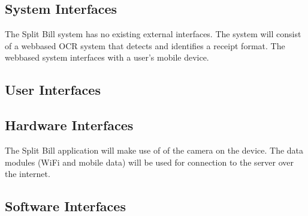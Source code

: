 \documentclass[12pt,a4paper]{article}
\begin{document}
   	\subsection{System Interfaces}
   		
		The Split Bill system has no existing external interfaces. The system will consist of a webbased OCR system that detects and identifies a receipt format. The webbased system interfaces with a user's mobile device.
   	\subsection{User Interfaces}
   		
   	\subsection{Hardware Interfaces}
   		
   		The Split Bill application will make use of of the camera on the device. The data modules (WiFi and mobile data) will be used for connection to the server over the internet.
   	\subsection{Software Interfaces}
		
\end{document}
